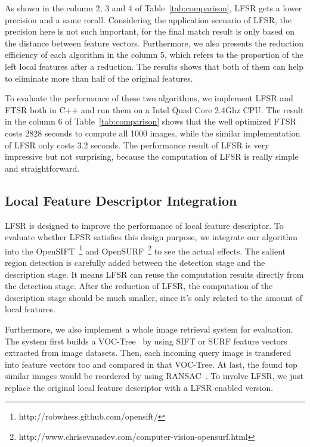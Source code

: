 As shown in the column 2, 3 and 4 of Table~\ref{tab:comparison}, LFSR gets a lower precision and a same recall. Considering the application scenario of LFSR, the precision here is not such important, for the final match result is only based on the distance between feature vectors. Furthermore, we also presents the reduction efficiency of each algorithm in the column 5, which refers to the proportion of the left local features after a reduction. The results shows that both of them can help to eliminate more than half of the original features.

To evaluate the performance of these two algorithms, we implement LFSR and FTSR both in C++ and run them on a Intel Quad Core 2.4Ghz CPU. The result in the column 6 of Table~\ref{tab:comparison} shows that the well optimized FTSR costs 2828 seconds to compute all 1000 images, while the similar implementation of LFSR only costs 3.2 seconds. The performance result of LFSR is very impressive but not surprising, because the computation of LFSR is really simple and straightforward.

\subsection{Local Feature Descriptor Integration}
\label{sec:evaluation_integration}

LFSR is designed to improve the performance of local feature descriptor. To evaluate whether LFSR satisfies this design purpose, we integrate our algorithm into the OpenSIFT~\footnote{http://robwhess.github.com/opensift/} and OpenSURF~\footnote{http://www.chrisevansdev.com/computer-vision-opensurf.html} to see the actual effects. The salient region detection is carefully added between the detection stage and the description stage. It means LFSR can reuse the computation results directly from the detection stage. After the reduction of LFSR, the computation of the description stage should be much smaller, since it's only related to the amount of local features.

Furthermore, we also implement a whole image retrieval system for evaluation. The system first builds a VOC-Tree~\cite{VOCTree2006} by using SIFT or SURF feature vectors extracted from image datasets. Then, each incoming query image is transfered into feature vectors too and compared in that VOC-Tree. At last, the found top similar images would be reordered by using RANSAC~\cite{ransac1981}. To involve LFSR, we just replace the original local feature descriptor with a LFSR enabled version.

